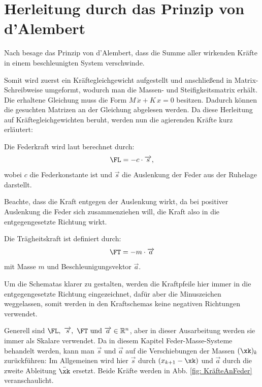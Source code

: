 \documentclass[a4paper,12pt]{report}
\newcommand{\R}{\mathbb R}
\newcommand{\1}{\mathds{1}}
\theoremstyle{plain} %
\theoremstyle{definition} %
\theoremstyle{remark}
\begin{document}
      \section{Herleitung durch das Prinzip von d'Alembert}
            Nach \cite{d_AlembertPrinzip} besage das Prinzip von d'Alembert, dass die Summe aller wirkenden Kräfte in einem beschleunigten System verschwinde.

            Somit wird zuerst ein Kräftegleichgewicht aufgestellt und anschließend in Matrix-Schreibweise umgeformt, wodurch man die Massen- und Steifigkeitsmatrix erhält.
            Die erhaltene Gleichung muss die Form $M\,\ddot x+K\,x = 0$ besitzen. Dadurch können die gesuchten Matrizen an der Gleichung abgelesen werden.
            Da diese Herleitung auf Kräftegleichgewichten beruht, werden nun die agierenden Kräfte kurz erläutert:

            Die Federkraft \FL wird laut \cite{federkraft} berechnet durch:
            \begin{equation}
                  \label{eqn: Federkraft}
                  \FL = -c\cdot \overrightarrow s,
            \end{equation}
            wobei $c$ die Federkonstante ist und $\overrightarrow s$ die Auslenkung der Feder aus der Ruhelage darstellt.

            Beachte, dass die Kraft entgegen der Auslenkung wirkt, da bei positiver Auslenkung die Feder sich zusammenziehen will, die Kraft also in die entgegengesetzte Richtung wirkt.
                  
            Die Trägheitskraft \FT ist definiert durch:
            \begin{equation}
                  \label{eqn: Trägheitskraft}
                  \FT = -m\cdot \overrightarrow{a}
            \end{equation}
            mit Masse $m$ und Beschleunigungsvektor $\overrightarrow{a}$.                  

            Um die Schematas klarer zu gestalten, werden die Kraftpfeile hier immer in die entgegengesetzte Richtung eingezeichnet, dafür aber die Minuszeichen weggelassen,
            somit werden in den Kraftschemas keine negativen Richtungen verwendet.

            Generell sind $\FL,\ \overrightarrow{s},\ \FT \text{ und } \overrightarrow{a}\in \R^n$, aber in dieser Ausarbeitung werden sie immer als Skalare verwendet. 
            Da in diesem Kapitel Feder-Masse-Systeme behandelt werden, kann man $\overrightarrow{s}$ und $\overrightarrow{a}$ auf die Verschiebungen der Massen $(\xk)_k$ zurückführen:
            Im Allgemeinen wird hier $\overrightarrow{s}$ durch $(x_{k+1}-\xk)$ und $\overrightarrow{a}$ durch die zweite Ableitung $\ddot \xk$ ersetzt.
            Beide Kräfte werden in Abb. \ref{fig: KräfteAnFeder} veranschaulicht.
\end{document}
